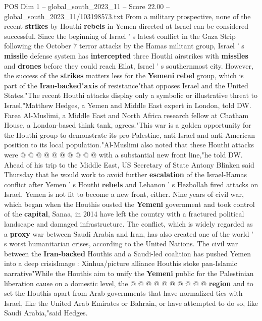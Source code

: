 \begin{textsample}{POS Dim 1 – global\_south\_2023\_11 – Score 22.00 – global\_south\_2023\_11/103198573.txt}  \label{ex:f1_pos_222}
From a military prospective, none of the recent \textbf{strikes} by Houthi \textbf{rebels} in Yemen directed at Israel can be considered successful.
Since the beginning of Israel ' s latest conflict in the Gaza Strip following the October 7 terror attacks by the Hamas militant group, Israel ' s \textbf{missile} defense system has \textbf{intercepted} three Houthi airstrikes with \textbf{missiles} and \textbf{drones} before they could reach Eilat, Israel ' s southernmost city.
However, the success of the \textbf{strikes} matters less for the \textbf{Yemeni} \textbf{rebel} group, which is part of the \textbf{Iran-backed}"\textbf{axis} of resistance"that opposes Israel and the United States."The recent Houthi attacks display only a symbolic or illustrative threat to Israel,"Matthew Hedges, a Yemen and Middle East expert in London, told DW.
Farea Al-Muslimi, a Middle East and North Africa research fellow at Chatham House, a London-based think tank, agrees."This war is a golden opportunity for the Houthi group to demonstrate its pro-Palestine, anti-Israel and anti-American position to its local population."Al-Muslimi also noted that these Houthi attacks were @ @ @ @ @ @ @ @ @ @ with a substantial new front line,"he told DW.
Ahead of his trip to the Middle East, US Secretary of State Antony Blinken said Thursday that he would work to avoid further \textbf{escalation} of the Israel-Hamas conflict after Yemen ' s Houthi \textbf{rebels} and Lebanon ' s Hezbollah fired attacks on Israel.
Yemen is not fit to become a new front, either.
Nine years of civil war, which began when the Houthis ousted the \textbf{Yemeni} government and took control of the \textbf{capital}, Sanaa, in 2014 have left the country with a fractured political landscape and damaged infrastructure.
The conflict, which is widely regarded as a \textbf{proxy} war between Saudi Arabia and Iran, has also created one of the world ' s worst humanitarian crises, according to the United Nations.
The civil war between the \textbf{Iran-backed} Houthis and a Saudi-led coalition has pushed Yemen into a deep crisisImage : Xinhua/picture alliance Houthis stoke pan-Islamic narrative"While the Houthis aim to unify the \textbf{Yemeni} public for the Palestinian liberation cause on a domestic level, the @ @ @ @ @ @ @ @ @ @ \textbf{region} and to set the Houthis apart from Arab governments that have normalized ties with Israel, like the United Arab Emirates or Bahrain, or have attempted to do so, like Saudi Arabia,"said Hedges.

\end{textsample}
